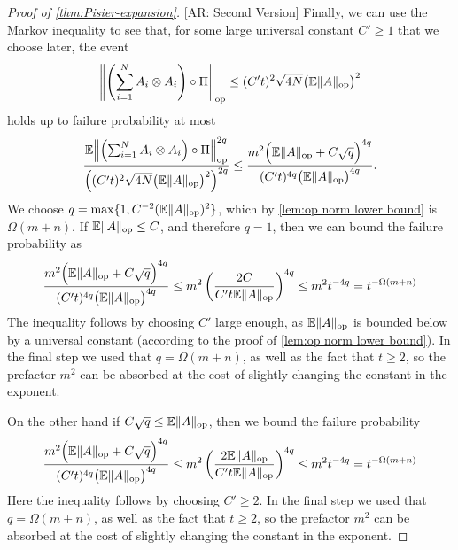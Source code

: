 \documentclass[aos]{imsart}
\theoremstyle{definition}
\numberwithin{equation}{section}
\DeclareMathOperator{\op}{op}
\DeclarePairedDelimiter{\norm}{\lVert}{\rVert}
\newcommand{\E}{\mathbb{E}}
\newcommand{\AR}[1]{{\color{orange}[AR: #1]}}
\begin{document}
\begin{appendix}
\begin{proof} [Proof of \cref{thm:Pisier-expansion}]
\AR{Second Version} Finally, we can use the Markov inequality to see that, for some large universal constant $C' \geq 1$ that we choose later, the event
\begin{align*}
  \norm*{\left(\sum_{i=1}^N A_i \otimes A_i \right) \circ \Pi}_{\op} \leq (C' t)^2 \sqrt{4 N} \bigl( \E \norm{A}_{\op} \bigr)^2
\end{align*}
holds up to failure probability at most
\begin{align*}
  \frac{\E \norm*{\left(\sum_{i=1}^N A_i \otimes A_i \right) \circ \Pi}_{\op}^{2q}}{\left( (C' t)^2 \sqrt{4 N} \bigl( \E \norm{A}_{\op} \bigr)^2 \right)^{2q}}
\leq %
  \frac{m^2 \Bigl( \E\norm A_{\op} + C \sqrt{q} \Bigr)^{4q}}{(C' t)^{4q} \bigl( \E \norm{A}_{\op} \bigr)^{4q}}.
\end{align*}
We choose $q = \max\{1, C^{-2} (\E \norm{A}_{\op})^{2} \}$, which by \cref{lem:op norm lower bound} is $\Omega(m + n)$. If $\E \norm{A}_{\op} \leq C$, and therefore $q = 1$, then we can bound the failure probability as
\begin{align*}
  \frac{m^2 \Bigl( \E\norm A_{\op} + C \sqrt{q} \Bigr)^{4q}}{(C' t)^{4q} \bigl( \E \norm{A}_{\op} \bigr)^{4q}}
\leq
m^2 \left( \frac{2 C}{C' t \E\norm A_{\op}} \right)^{4q}
\leq m^2 t^{-4q}
= t^{-\Omega(m+n)}
\end{align*}
The inequality follows by choosing $C'$ large enough, as $\E\norm A_{\op}$ is bounded below by a universal constant (according to the proof of \cref{lem:op norm lower bound}). In the final step we used that $q = \Omega(m + n)$, as well as the fact that $t \geq 2$, so the prefactor $m^{2}$ can be absorbed at the cost of slightly changing the constant in the exponent.

On the other hand if $C \sqrt{q} \leq \E \norm{A}_{\op}$, then we bound the failure probability
\begin{align*}
  \frac{m^2 \Bigl( \E\norm A_{\op} + C \sqrt{q} \Bigr)^{4q}}{(C' t)^{4q} \bigl( \E \norm{A}_{\op} \bigr)^{4q}}
\leq
m^2 \left( \frac{2 \E\norm A_{\op}}{C' t \E\norm A_{\op}} \right)^{4q}
\leq m^2 t^{-4q}
= t^{-\Omega(m+n)}
\end{align*}
Here the inequality follows by choosing $C' \geq 2$. In the final step we used that $q = \Omega(m + n)$, as well as the fact that $t \geq 2$, so the prefactor $m^{2}$ can be absorbed at the cost of slightly changing the constant in the exponent.
\end{proof}



\end{appendix}
\end{document}
